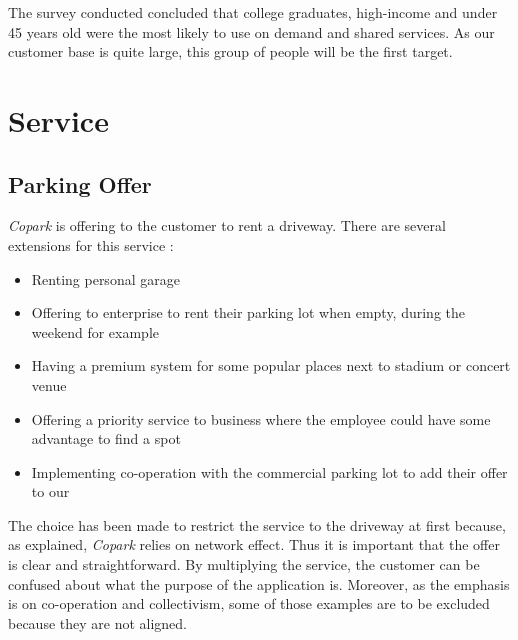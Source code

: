 \documentclass[12pt,a4paper,oneside]{book}
\newcommand{\bp}{\textit{Copark }}
\begin{document}
The survey conducted concluded that college graduates, high-income and under 45 years old were the most likely to use on demand and shared services.\cite{airbnbuse} As our customer base is quite large, this group of people will be the first target.

\section{Service}
\subsection{Parking Offer}
\bp is offering to the customer to rent a driveway. There are several extensions for this service :
\begin{itemize}
\item Renting personal garage
\item Offering to enterprise to rent their parking lot when empty, during the weekend for example
\item Having a premium system for some popular places next to stadium or concert venue
\item Offering a priority service to business where the employee could have some advantage to find a spot
\item Implementing co-operation with the commercial parking lot to add their offer to our
\end{itemize} 
The choice has been made to restrict the service to the driveway at first because, as explained, \bp relies on network effect. Thus it is important that the offer is clear and straightforward. By multiplying the service, the customer can be confused about what the purpose of the application is. Moreover, as the emphasis is on co-operation and collectivism, some of those examples are to be excluded because they are not aligned.
\end{document}
